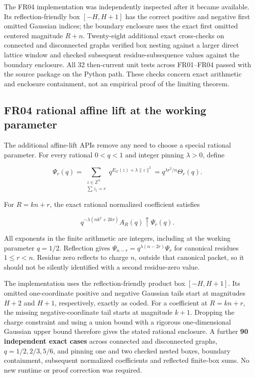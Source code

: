 \documentclass[
  11pt,
  a4paper,
]{report}
\begin{document}
The FR04 implementation was independently inspected after it became
available. Its reflection-friendly box \([-H,H+1]\) has the correct
positive and negative first omitted Gaussian indices; the boundary
enclosure uses the exact first omitted centered magnitude \(R+n\).
Twenty-eight additional exact cross-checks on connected and disconnected
graphs verified box nesting against a larger direct lattice window and
checked subsequent residue-subsequence values against the boundary
enclosure. All 32 then-current unit tests across FR01--FR04 passed with
the source package on the Python path. These checks concern exact
arithmetic and enclosure containment, not an empirical proof of the
limiting theorem.

\hypertarget{fr04-rational-affine-lift-at-the-working-parameter}{%
\subsection{FR04 rational affine lift at the working
parameter}\label{fr04-rational-affine-lift-at-the-working-parameter}}

The additional affine-lift APIs remove any need to choose a special
rational parameter. For every rational \(0<q<1\) and integer pinning
\(\lambda>0\), define

\[
 \Psi_r(q)=\sum_{\substack{z\in\mathbb Z^n\\\sum z_i=r}}
 q^{E_G(z)+\lambda\|z\|^2}
 =q^{\lambda r^2/n}\Theta_r(q).
\]

For \(R=kn+r\), the exact rational normalized coefficient satisfies

\[
 q^{-\lambda(nk^2+2kr)}A_R(q)\uparrow\Psi_r(q).
\]

All exponents in the finite arithmetic are integers, including at the
working parameter \(q=1/2\). Reflection gives
\(\Psi_{n-r}=q^{\lambda(n-2r)}\Psi_r\) for canonical residues
\(1\le r<n\). Residue zero reflects to charge \(n\), outside that
canonical packet, so it should not be silently identified with a second
residue-zero value.

The implementation uses the reflection-friendly product box
\([-H,H+1]\). Its omitted one-coordinate positive and negative Gaussian
tails start at magnitudes \(H+2\) and \(H+1\), respectively, exactly as
coded. For a coefficient at \(R=kn+r\), the missing negative-coordinate
tail starts at magnitude \(k+1\). Dropping the charge constraint and
using a union bound with a rigorous one-dimensional Gaussian upper bound
therefore gives the stated rational enclosure. A further \textbf{90
independent exact cases} across connected and disconnected graphs,
\(q=1/2,2/3,5/6\), and pinning one and two checked nested boxes,
boundary containment, subsequent normalized coefficients and reflected
finite-box sums. No new runtime or proof correction was required.
\end{document}
